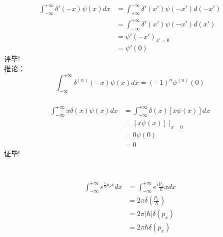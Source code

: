 \begin{frame}
	  \frametitle{}
	  \[
		\begin{aligned}
		  \int_{-\infty}^{+\infty} \delta'(-x) \psi (x) d x &= \int_{+\infty}^{-\infty} \delta'(x') \psi (-x') d (-x') \\
			&= \int_{-\infty}^{+\infty} \delta'(x') \psi (-x') d (x') \\
			&=  \psi' (-x') _{x'=0}\\
			&=  \psi' (0) 
		\end{aligned}
		   \]
		评毕!\\ \vspace{1em}
		推论：\[ \int_{-\infty}^{+\infty} \delta^{(n)}(-x) \psi (x) d x = (-1)^n \psi^{(n)} (0)\]
\end{frame}

\begin{frame}
	\frametitle{}
	\例 [3. 试证明 ]
	{\[ x\delta(x)  = 0\]}
	\证 \[
		\begin{aligned}
		  \int_{-\infty}^{+\infty} x\delta(x) \psi (x) d x &= \int_{-\infty}^{+\infty} \delta(x) [x \psi (x)] d x \\
		    &=  [x \psi (x)] \mid_{x=0} \\
			&=  0\psi (0) \\
			&=  0
		\end{aligned}
		   \]
		证毕!
\end{frame}

\begin{frame}
	\frametitle{}
	\证 ~  \[
		\begin{aligned}
			\int_{-\infty}^{+\infty} e^{\frac{i}{\hbar} p_x x} d x &= \int_{-\infty}^{+\infty} e^i{\frac{p_x}{\hbar} x} d x  \\
			&= 2\pi \delta(\frac{p_x}{\hbar}) \\
			&= 2\pi \left|\hbar\right| \delta(p_x) \\
			&= 2\pi \hbar \delta(p_x) \\
		\end{aligned}
		   \]
\end{frame}

